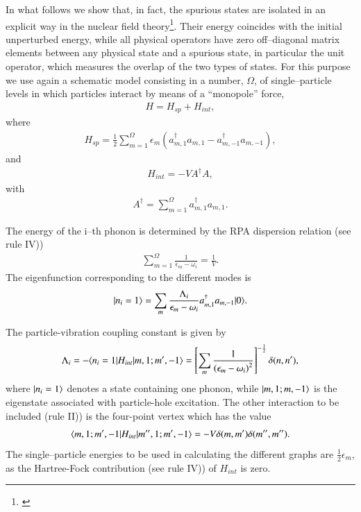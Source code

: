 In what follows we show that, in fact, the spurious states are isolated in an
explicit way in the nuclear field theory\footnote{\cite{Broglia:76}}. Their energy coincides with the
initial unperturbed  energy, while all physical operators have zero off--diagonal
matrix elements between any physical state and a spurious state, in particular
the unit operator, which measures the overlap of the two types of states.
For this purpose we use again a schematic model consisting in a number, $\Omega$,
of single--particle levels in which particles interact by means of a ``monopole''
force,
 \begin{align}\label{eqC1A46} 
H=H_{sp}+H_{int},
 \end{align}
where
 \begin{align}\label{eqC1A47} 
H_{sp}=\frac{1}{2}\sum_{m=1}^\Omega\epsilon_m\left(a^\dagger_{m,1}a_{m,1}-a^\dagger_{m,-1}a_{m,-1}\right),
 \end{align}
and
 \begin{align}\label{eqC1A48} 
H_{int}=-VA^\dagger A,
 \end{align}
with
 \begin{align}\label{eqC1A49} 
 A^\dagger=\sum_{m=1}^\Omega a^\dagger_{m,1}a_{m,1}.
 \end{align}

The energy of the i--th phonon is determined by the RPA dispersion relation (see rule IV)) 
 \begin{align}\label{eqC1A50} 
\sum_{m=1}^{\Omega}\frac{1}{\epsilon_m-\omega_i}=\frac{1}{V}.
 \end{align}
The eigenfunction corresponding to the different modes is 
 \begin{align}\label{eqC1A51} 
|{n_i=1} \rangle=\sum_m\frac{\Lambda_i}{\epsilon_m-\omega_i}a^\dagger_{m,1}a_{m,-1}|{0} \rangle.
 \end{align}


The particle-vibration coupling constant is given by 
 \begin{align}\label{eqC1A52} 
\Lambda_i=-\langle {n_i=1|H_{int}|m,1;m',-1} \rangle=\left[\sum_m\frac{1}{\left(\epsilon_m-\omega_i\right)^2}\right]^{-\frac{1}{2}}\delta(n,n'),
 \end{align} 
where $|{n_i=1} \rangle$ denotes a state containing one phonon, while $|{m,1;m,-1} \rangle$ is the eigenstate associated with particle-hole excitation. The other interaction to be included (rule II)) is the four-point vertex which has the value 
 \begin{align}\label{eqC1A53} 
\langle {m,1;m',-1|H_{int}|m'',1;m',-1} \rangle=-V\delta(m,m')\delta(m'',m'').
 \end{align} 
The single--particle energies to be used in calculating the different graphs are $\frac{1}{2}\epsilon_m$, as the Hartree-Fock contribution (see rule IV)) of $H_{int}$ is zero. 


